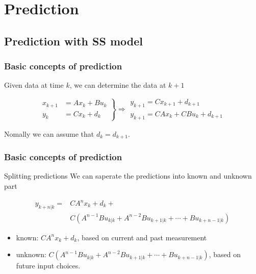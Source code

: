 \documentclass{beamer}
\begin{document}
\section{Prediction}
\label{lqr}

\subsection{Prediction with SS model}

\begin{frame}
\frametitle{Basic concepts of prediction}

Given data at time $k$, we can determine the data at $k+1$

\begin{equation}
\left.\begin{array}{rl}{x_{k+1}} & {=A x_{k}+B u_{k}} \\ {y_{k}} & {=C x_{k}+d_{k}}\end{array}\right\} \Rightarrow \begin{array}{c}{y_{k+1}=C x_{k+1}+d_{k+1}} \\ {y_{k+1}=C A x_{k}+C B u_{k}+d_{k+1}}\end{array}
\end{equation}

Nomally we can assume that $d_k=d_{k+1}$.

\end{frame}

\begin{frame}
\frametitle{Basic concepts of prediction}

\begin{block}{Splitting predictions}
	We can saperate the predictions into known and unknown part
	
	
\end{block}
\begin{equation}
	\begin{split}
		y_{k+n| k}=&C A^{n} x_{k}+d_{k}+\\
		&C\left(A^{n-1} B u_{k |k}+A^{n-2} B u_{k+1 |k}+\cdots+B u_{k+n-1| k}\right)
	\end{split}
\end{equation}

\begin{itemize}
\item known: $C A^{n} x_{k}+d_{k}$, based on current and past measurement

\item unknown: $C\left(A^{n-1} B u_{k |k}+A^{n-2} B u_{k+1 |k}+\cdots+B u_{k+n-1| k}\right)$, based on future input choices.
\end{itemize}
\end{frame}
\end{document}

